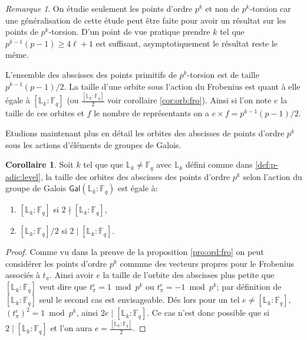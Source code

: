 \documentclass[10pt,a4paper]{book}
\theoremstyle{plain}
\theoremstyle{definition}
\theoremstyle{definition}
\newtheorem{cor}[thm]{Corollaire}
\theoremstyle{definition}
\theoremstyle{definition}
\theoremstyle{remark}
\newtheorem{rem}[thm]{Remarque}
\theoremstyle{remark}
\theoremstyle{definition}
\begin{document}
\begin{rem}
On étudie seulement les points d'ordre $p^k$ et non de $p^k$-torsion car une 
généralisation de cette étude peut être faite pour avoir un résultat sur les 
points de $p^k$-torsion. D'un point de vue pratique prendre $k$ tel que 
$p^{k-1}(p-1) \geqslant 4 \ell +1$ est suffisant, asymptotiquement le résultat 
reste le même.
\end{rem}

L'ensemble des abscisses des points primitifs de $p^k$-torsion est de taille 
$p^{k-1}(p-1)/2$. La taille d'une orbite sous l'action du Frobenius est quant à
elle égale à $[\mathbb{L}_k:\mathbb{F}_q]$ (ou 
$\frac{[\mathbb{L}_k:\mathbb{F}_q]}{2}$ voir corollaire \ref{cor:orb:fro}). 
Ainsi si l'on note $e$ la taille de ces orbites et $f$ le nombre de 
représentants on a $e \times f=p^{k-1}(p-1)/2$.

Etudions maintenant plus en détail les orbites des abscisses de points d'ordre $p^k$ sous les actions d'éléments de groupes de Galois.

\begin{cor}
Soit $k$ tel que que $\mathbb{L}_k \neq \mathbb{F}_q$ avec $\mathbb{L}_k$ défini comme dans \ref{def:p-adic:level}, 
la taille des orbites des abscisses des points d'ordre $p^k$ selon l'action du groupe de Galois $\mathsf{Gal}(\mathbb{L}_k:\mathbb{F}_q)$  est égale à:
\begin{enumerate} 
\item $[\mathbb{L}_k:\mathbb{F}_q]$ si $2 \nmid [\mathbb{L}_k:\mathbb{F}_q]$,
\item $[\mathbb{L}_k:\mathbb{F}_q]/2$ si $2 \mid [\mathbb{L}_k:\mathbb{F}_q]$.
\end{enumerate}
\end{cor}

\begin{proof}
Comme vu dans la preuve de la proposition \ref{pro:ord:fro} on peut considérer les points d'ordre $p^k$ commme des vecteurs propres pour le Frobenius associés à $t_{\pi}$. Ainsi avoir $e$ la taille de l'orbite des abscisses plus petite que  $[\mathbb{L}_k:\mathbb{F}_q]$ veut dire que $t_{\pi}^e=1 \bmod p^k$ ou $t_{\pi}^e=-1 \bmod p^k$; par définition de $[\mathbb{L}_k:\mathbb{F}_q]$ seul le second cas est envisageable. Dés lors pour un tel $e \neq [\mathbb{L}_k:\mathbb{F}_q]$,  $(t_{\pi}^{e})^2=1 \bmod p^k$, ainsi $2e \mid [\mathbb{L}_k:\mathbb{F}_q]$. Ce cas n'est donc possible que si $2 \mid [\mathbb{L}_k:\mathbb{F}_q]$ et l'on aura $e= \frac{[\mathbb{L}_k:\mathbb{F}_q]}{2}$. 
\end{proof}
\end{document}
